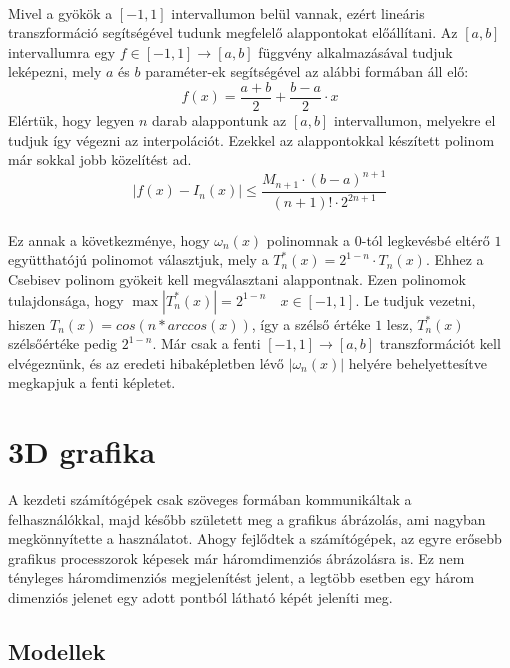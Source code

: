 \documentclass{elteikthesis}
\begin{document}
\paragraph{}
Mivel a gyökök a $[-1, 1]$ intervallumon belül vannak, ezért lineáris transzformáció segítségével tudunk megfelelő alappontokat előállítani. Az $[a,b]$ intervallumra egy $f \in [-1,1] \rightarrow [a,b]$ függvény alkalmazásával tudjuk leképezni, mely $a$ és $b$ paraméter-ek segítségével az alábbi formában áll elő:
$$
f(x) = \frac{a+b}{2}+\frac{b-a}{2} \cdot x
$$
Elértük, hogy legyen $n$ darab alappontunk az $[a,b]$ intervallumon, melyekre el tudjuk így végezni az interpolációt. Ezekkel az alappontokkal készített polinom már sokkal jobb közelítést ad.
$$
|f(x)-I_n(x)| \leq \frac{M_{n+1}\cdot(b-a)^{n+1}}{(n+1)! \cdot 2^{2n+1}}
$$
\paragraph{}
Ez annak a következménye, hogy $\omega_n(x)$ polinomnak a $0$-tól legkevésbé eltérő $1$ együtthatójú polinomot választjuk, mely a $T^*_n(x) = 2^{1-n} \cdot T_n(x)$. Ehhez a Csebisev polinom gyökeit kell megválasztani alappontnak. Ezen polinomok tulajdonsága, hogy $\max |T^*_n(x)| = 2^{1-n} \quad x \in [-1,1]$. Le tudjuk vezetni, hiszen $T_n(x) = cos(n*arccos(x))$, így a szélső értéke $1$ lesz, $T^*_n(x)$ szélsőértéke pedig $2^{1-n}$.
Már csak a fenti $[-1,1] \rightarrow [a,b]$ transzformációt kell elvégeznünk, és az eredeti hibaképletben lévő $|\omega_n(x)|$ helyére behelyettesítve megkapjuk a fenti képletet.
\newpage
\section{3D grafika}
A kezdeti számítógépek csak szöveges formában kommunikáltak a felhasználókkal, majd később született meg a grafikus ábrázolás, ami nagyban megkönnyítette a használatot. Ahogy fejlődtek a számítógépek, az egyre erősebb grafikus processzorok képesek már háromdimenziós ábrázolásra is. Ez nem tényleges háromdimenziós megjelenítést jelent, a legtöbb esetben egy három dimenziós jelenet egy adott pontból látható képét jeleníti meg.
\subsection{Modellek}
\end{document}
